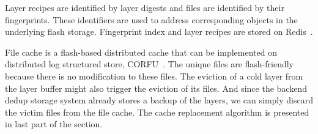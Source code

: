 Layer recipes are identified by layer digests and files are identified by their fingerprints.
These identifiers are used to address corresponding objects in the underlying flash storage. 
Fingerprint index and layer recipes are stored on Redis~\cite{redis}.

File cache is a flash-based distributed cache that can be implemented on 
distributed log structured store, \eg CORFU~\cite{180277}.
The unique files are flash-friendly because there is no modification to these files.
%
%
The eviction of a cold layer from the layer buffer might also trigger the eviction of its files.
And since the backend dedup storage system already stores a backup of the layers, 
we can simply discard the victim files from the file cache.
The cache replacement algorithm is presented in last part of the section. 

%
%
%

